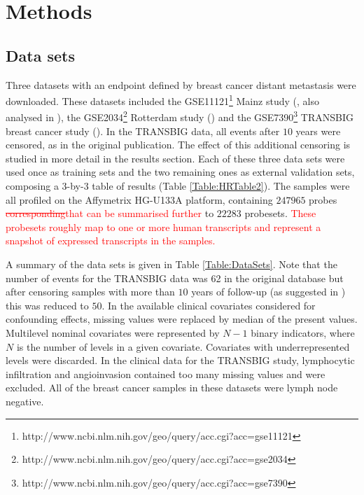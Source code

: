 \documentclass[letterpaper,12pt]{article}
\begin{document}
\section{Methods}
\subsection{Data sets}
Three datasets with an endpoint defined by breast cancer distant metastasis were downloaded. These datasets included the GSE11121\footnote{http://www.ncbi.nlm.nih.gov/geo/query/acc.cgi?acc=gse11121} Mainz study (\citet{Schmidt:08}, also analysed in \citet{Kammers:11}), the GSE2034\footnote{http://www.ncbi.nlm.nih.gov/geo/query/acc.cgi?acc=gse2034} Rotterdam study (\citet{Wang:05}) and the GSE7390\footnote{http://www.ncbi.nlm.nih.gov/geo/query/acc.cgi?acc=gse7390} TRANSBIG breast cancer study (\citet{Desmedt:07}). In the TRANSBIG data, all events after $10$ years were censored, as in the original publication. The effect of this additional censoring is studied in more detail in the results section. Each of these three data sets were used once as training sets and the two remaining ones as external validation sets, composing a 3-by-3 table of results (Table \ref{Table:HRTable2}). The samples were all profiled on the Affymetrix HG-U133A platform, containing $247965$ probes \textcolor{red}{\sout{corresponding}that can be summarised further} to $22283$ probesets. \textcolor{red}{These probesets roughly map to one or more human transcripts and represent a snapshot of expressed transcripts in the samples.}

A summary of the data sets is given in Table \ref{Table:DataSets}. Note that the number of events for the TRANSBIG data was 62 in the original database but after censoring samples with more than $10$ years of follow-up (as suggested in \citet{Desmedt:07}) this was reduced to $50$. In the available clinical covariates considered for confounding effects, missing values were replaced by median of the present values. Multilevel nominal covariates were represented by $N-1$ binary indicators, where $N$ is the number of levels in a given covariate. Covariates with underrepresented levels were discarded. In the clinical data for the TRANSBIG study, lymphocytic infiltration and angioinvasion contained too many missing values and were excluded. All of the breast cancer samples in these datasets were lymph node negative.
\end{document}
